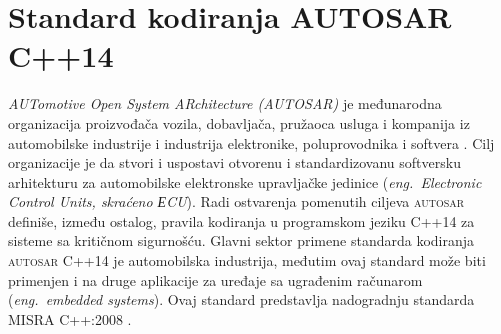 \documentclass[12pt,oneside]{memoir}
\begin{document}











\chapter{Standard kodiranja \textsc{AUTOSAR} C++14}
\label{chp:autosar}

\textit{AUTomotive Open System ARchitecture (\textsc{AUTOSAR})} je međunarodna organizacija proizvođača vozila, dobavljača, pružaoca usluga i kompanija iz automobilske industrije i industrija elektronike, poluprovodnika i softvera \cite{autosarWebsite}. 
Cilj organizacije je da stvori i uspostavi otvorenu i standardizovanu softversku arhitekturu za automobilske elektronske upravljačke jedinice (\textit{eng.~Electronic Control Units, skra\'{c}eno ЕCU}).
Radi ostvarenja pomenutih ciljeva \textsc{autosar} definiše, između ostalog, pravila kodiranja u programskom jeziku C++14 za sisteme sa kriti\v{c}nom sigurno\v{s}\'{c}u. Glavni sektor primene standarda kodiranja \textsc{autosar} C++14 je automobilska industrija, međutim ovaj standard može biti primenjen
i na druge aplikacije za uređaje sa ugrađenim računarom (\textit{eng.~embedded systems}). Ovaj standard predstavlja nadogradnju standarda MISRA C++:2008 \cite{AutosarGuidelines}.
\end{document}
